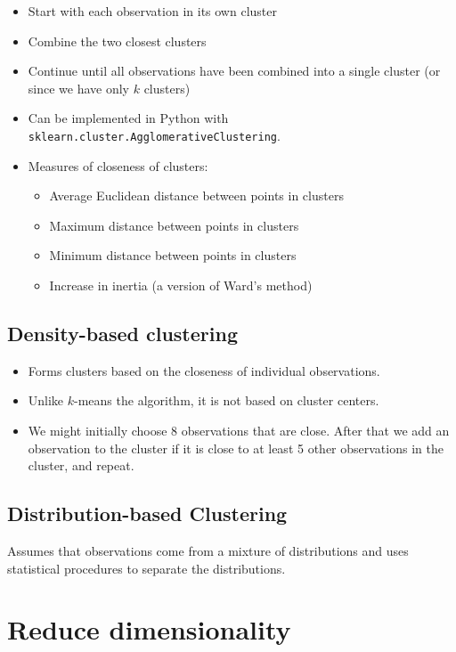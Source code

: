\begin{itemize}
    \item Start with each observation in its own cluster
    \item Combine the two closest clusters
    \item Continue until all observations have been combined into a single cluster (or since we have only $k$ clusters)
    \item Can be implemented in Python with \texttt{sklearn.cluster.AgglomerativeClustering}.
    \item Measures of closeness of clusters:
    \begin{itemize}
        \item Average Euclidean distance between points in clusters
        \item Maximum distance between points in clusters
        \item Minimum distance between points in clusters
        \item Increase in inertia (a version of Ward's method)
    \end{itemize}
\end{itemize}

\subsection{Density-based clustering}

\begin{itemize}
    \item Forms clusters based on the closeness of individual observations.
    \item Unlike $k$-means the algorithm, it is not based on cluster centers.
    \item We might initially choose 8 observations that are close. After that we add an observation to the cluster if it is close to at least 5 other observations in the cluster, and repeat. 
\end{itemize}

\subsection{Distribution-based Clustering}

Assumes that observations come from a mixture of distributions and uses statistical procedures to separate the distributions.

\section{Reduce dimensionality}

